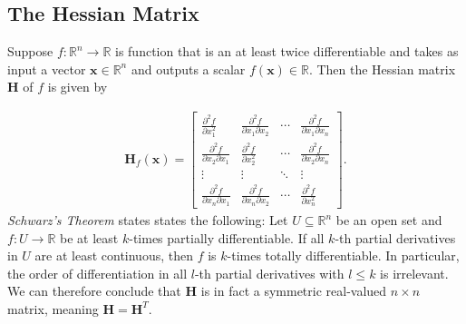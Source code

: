 \subsection{The Hessian Matrix}
\label{sec:hessian}

Suppose \( f: \mathbb{R}^n \to \mathbb{R} \) is function that is an at least twice differentiable and takes as input a vector \( \mathbf{x} \in \mathbb{R}^n \) and 
outputs a scalar \( f(\mathbf{x}) \in \mathbb{R} \). Then the Hessian matrix \( \mathbf{H} \) of \( f \) is given by

\begin{align}
    \label{eq:hessian}
    \mathbf{H}_f(\mathbf{x}) = \begin{bmatrix}
    \frac{\partial^2 f}{\partial x_1^2} & \frac{\partial^2 f}{\partial x_1 \partial x_2} & \cdots & \frac{\partial^2 f}{\partial x_1 \partial x_n} \\
    \frac{\partial^2 f}{\partial x_2 \partial x_1} & \frac{\partial^2 f}{\partial x_2^2} & \cdots & \frac{\partial^2 f}{\partial x_2 \partial x_n} \\
    \vdots & \vdots & \ddots & \vdots \\
    \frac{\partial^2 f}{\partial x_n \partial x_1} & \frac{\partial^2 f}{\partial x_n \partial x_2} & \cdots & \frac{\partial^2 f}{\partial x_n^2}
    \end{bmatrix}.
\end{align}
\emph{Schwarz's Theorem} states states the following: Let \( U \subseteq \mathbb{R}^n \) be an open set and \( f \colon U \to \mathbb{R} \) be at least \( k \)-times partially differentiable.
If all \( k \)-th partial derivatives in \( U \) are at least continuous, then \( f \) is \( k \)-times totally differentiable.
In particular, the order of differentiation in all \( l \)-th partial derivatives with \( l \leq k \) is irrelevant. \cite{arens2011mathematik} \\
We can therefore conclude that \( \mathbf{H} \) is in fact a symmetric real-valued $n\times n$ matrix, meaning \( \mathbf{H} = \mathbf{H}^T \).\\
